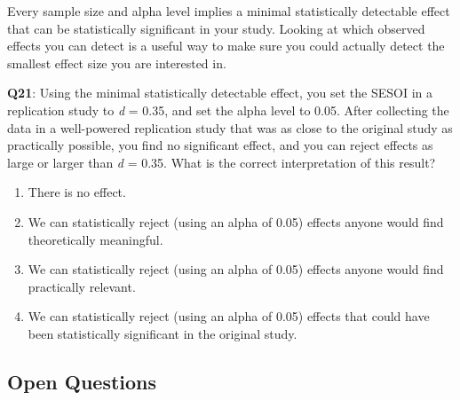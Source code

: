 \documentclass[
  oneside]{krantz}
\providecommand{\tightlist}{%
  \setlength{\itemsep}{0pt}\setlength{\parskip}{0pt}}
\begin{document}
Every sample size and alpha level implies a minimal statistically detectable effect that can be statistically significant in your study. Looking at which observed effects you can detect is a useful way to make sure you could actually detect the smallest
effect size you are interested in.

\textbf{Q21}: Using the minimal statistically detectable effect, you set the SESOI in a replication study to \emph{d} = 0.35, and set the alpha level to 0.05. After collecting the data in a well-powered replication study that was as close to the original study as practically possible, you find no significant effect, and you can reject effects as large or larger than \emph{d} = 0.35. What is the correct interpretation of this result?

\begin{enumerate}
\def\labelenumi{\Alph{enumi})}
\tightlist
\item
  There is no effect.
\item
  We can statistically reject (using an alpha of 0.05) effects anyone would find theoretically meaningful.
\item
  We can statistically reject (using an alpha of 0.05) effects anyone would find practically relevant.
\item
  We can statistically reject (using an alpha of 0.05) effects that could have been statistically significant in the original study.
\end{enumerate}

\hypertarget{open-questions-7}{%
\subsection{Open Questions}\label{open-questions-7}}
\end{document}
